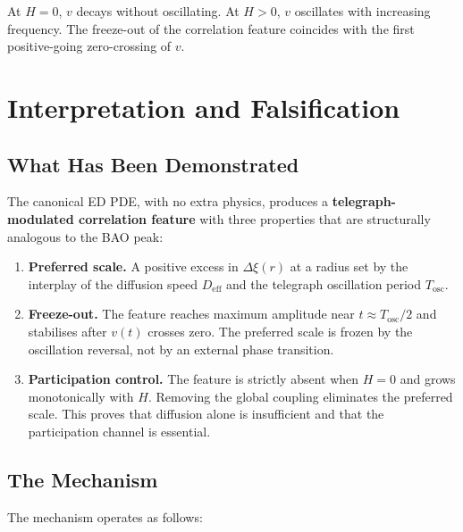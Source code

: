 \documentclass[11pt]{article}
\begin{document}
At \(H = 0\), \(v\) decays without oscillating. At \(H > 0\), \(v\) oscillates with increasing frequency. The freeze-out of the correlation feature coincides with the first positive-going zero-crossing of \(v\).

\section{Interpretation and Falsification}

\subsection{What Has Been Demonstrated}

The canonical ED PDE, with no extra physics, produces a \textbf{telegraph-modulated correlation feature} with three properties that are structurally analogous to the BAO peak:

\begin{enumerate}
  \item \textbf{Preferred scale.} A positive excess in \(\Delta\xi(r)\) at a radius set by the interplay of the diffusion speed \(D_{\mathrm{eff}}\) and the telegraph oscillation period \(T_{\mathrm{osc}}\).

  \item \textbf{Freeze-out.} The feature reaches maximum amplitude near \(t \approx T_{\mathrm{osc}}/2\) and stabilises after \(v(t)\) crosses zero. The preferred scale is frozen by the oscillation reversal, not by an external phase transition.

  \item \textbf{Participation control.} The feature is strictly absent when \(H = 0\) and grows monotonically with \(H\). Removing the global coupling eliminates the preferred scale. This proves that diffusion alone is insufficient and that the participation channel is essential.
\end{enumerate}

\subsection{The Mechanism}

The mechanism operates as follows:
\end{document}
